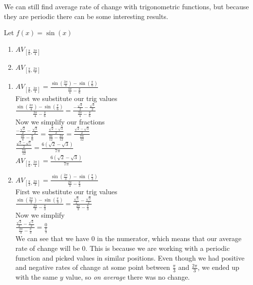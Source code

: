 \documentclass{ximera}
\begin{document}
We can still find average rate of change with trigonometric functions, but because they are periodic there can be some interesting results.

\begin{example}
Let $f(x) =\sin(x)$
\begin{enumerate}
\item $AV_{[\frac{\pi}{6},\frac{3\pi}{4}]} $
\item $AV_{[\frac{\pi}{3},\frac{2\pi}{3}]} $
\end{enumerate}
\begin{explanation}
\begin{enumerate}
\item $AV_{[\frac{\pi}{6},\frac{3\pi}{4}]}  = \frac{\sin(\frac{3\pi}{4})-\sin(\frac{\pi}{6})}{\frac{3\pi}{4} - \frac{\pi}{6}}$\\
First we substitute our trig values\\
$\frac{\sin(\frac{3\pi}{4})-\sin(\frac{\pi}{6})}{\frac{3\pi}{4} - \frac{\pi}{6}}=\frac{-\frac{\sqrt{2}}{2}-\frac{\sqrt{3}}{2}}{\frac{3\pi}{4} - \frac{\pi}{6}}$\\
Now we simplify our fractions\\
$\frac{-\frac{\sqrt{2}}{2}-\frac{\sqrt{3}}{2}}{\frac{3\pi}{4} - \frac{\pi}{6}}= \frac{\frac{\sqrt{2}-\sqrt{3}}{2}}{\frac{9\pi}{12} - \frac{2\pi}{12}}= \frac{\frac{\sqrt{2}-\sqrt{3}}{2}}{\frac{7\pi}{12}}$\\
$\frac{\frac{\sqrt{2}-\sqrt{3}}{2}}{\frac{7\pi}{12}}=\frac{6(\sqrt{2}-\sqrt{3})}{7\pi}$\\
$AV_{[\frac{\pi}{6},\frac{3\pi}{4}]} =\frac{6(\sqrt{2}-\sqrt{3})}{7\pi}$

\item $AV_{[\frac{\pi}{3},\frac{2\pi}{3}]} = \frac{\sin(\frac{2\pi}{3})-\sin(\frac{\pi}{3})}{\frac{2\pi}{3} - \frac{\pi}{3}}$\\
First we substitute our trig values\\
$\frac{\sin(\frac{2\pi}{3})-\sin(\frac{\pi}{3})}{\frac{2\pi}{3} - \frac{\pi}{3}} = \frac{\frac{\sqrt{3}}{2}-\frac{\sqrt{3}}{2}}{\frac{2\pi}{3} - \frac{\pi}{3}}$\\
Now we simplify\\
$\frac{\frac{\sqrt{3}}{2}-\frac{\sqrt{3}}{2}}{\frac{2\pi}{3} - \frac{\pi}{3}}=\frac{0}{\frac{\pi}{3}}$\\
We can see that we have $0$ in the numerator, which means that our average rate of change will be $0$. This is because we are working with a periodic function and picked values in similar positions. Even though we had positive and negative rates of change at some point between $\frac{\pi}{3}$ and $\frac{2\pi}{3}$, we ended up with the same $y$ value, so \textit{on average} there was no change.
\end{enumerate}
\end{explanation}
\end{example}
\end{document}
